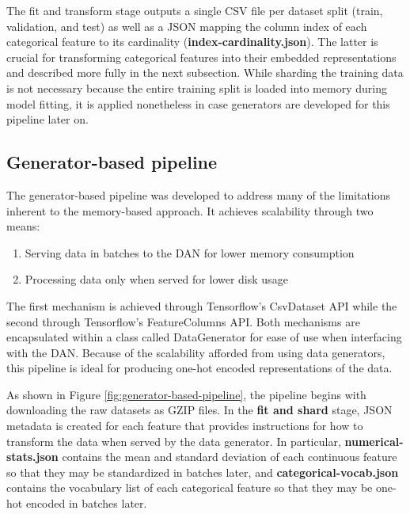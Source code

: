 \documentclass{proc}
\begin{document}
The fit and transform stage outputs a single CSV file per dataset split (train, validation, and test) as well as a JSON mapping the column index of each categorical feature to its cardinality (\textbf{index-cardinality.json}). The latter is crucial for transforming categorical features into their embedded representations and described more fully in the next subsection. While sharding the training data is not necessary because the entire training split is loaded into memory during model fitting, it is applied nonetheless in case generators are developed for this pipeline later on.

\subsection{Generator-based pipeline}

The generator-based pipeline was developed to address many of the limitations inherent to the memory-based approach. It achieves scalability through two means:

\begin{enumerate}
\item{Serving data in batches to the DAN for lower memory consumption}
\item{Processing data only when served for lower disk usage}
\end{enumerate}

The first mechanism is achieved through Tensorflow's CsvDataset API while the second through Tensorflow's FeatureColumns API. Both mechanisms are encapsulated within a class called DataGenerator for ease of use when interfacing with the DAN. Because of the scalability afforded from using data generators, this pipeline is ideal for producing one-hot encoded representations of the data.

As shown in Figure \ref{fig:generator-based-pipeline}, the pipeline begins with downloading the raw datasets as GZIP files. In the \textbf{fit and shard} stage, JSON metadata is created for each feature that provides instructions for how to transform the data when served by the data generator. In particular, \textbf{numerical-stats.json} contains the mean and standard deviation of each continuous feature so that they may be standardized in batches later, and \textbf{categorical-vocab.json} contains the vocabulary list of each categorical feature so that they may be one-hot encoded in batches later.
\end{document}
